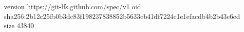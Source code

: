 version https://git-lfs.github.com/spec/v1
oid sha256:2b12c25fb0b3dc83f198237838852b5633cb41df7224c1e1efacdb4b2b43e6ed
size 43840
